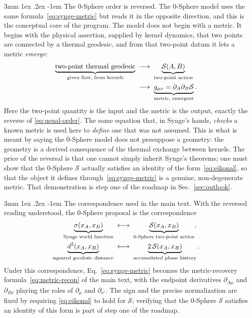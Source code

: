 \documentclass[%
 reprint, amsmath,amssymb, aps, prb, ]{revtex4-2}
\makeatletter
\numberwithin{equation}{section}
\renewcommand\paragraph{%
  \@startsection{paragraph}{4}{\z@}%
    {3mm \@plus 1ex \@minus .2ex}%
    {-1em}%
    {\normalfont\normalsize\itshape}}
\makeatother
\begin{document}
\paragraph{The 0-Sphere order is reversed.}
The 0-Sphere model uses the same formula~\eqref{eq:synge-metric} but reads it in the opposite direction, and this is the conceptual core of the program. The model does not begin with a metric. It begins with the physical assertion, supplied by kernel dynamics, that two points are connected by a thermal geodesic, and from that two-point datum it lets a metric \emph{emerge}:
\begin{align}
\underbrace{\text{two-point thermal geodesic}}_{\text{given first, from kernels}}
&\;\longrightarrow\;
\underbrace{\mathcal{S}(A,B)}_{\text{two-point action}}
\notag\\
&\;\longrightarrow\;
\underbrace{g_{\mu\nu}=\partial_A\partial_B\mathcal{S}}_{\text{metric, emergent}}.
\label{eq:zsm-order}
\end{align}
Here the two-point quantity is the input and the metric is the output, exactly the reverse of \eqref{eq:usual-order}. The same equation that, in Synge's hands, \emph{checks} a known metric is used here to \emph{define} one that was not assumed. This is what is meant by saying the 0-Sphere model does not presuppose a geometry: the geometry is a derived consequence of the thermal exchange between kernels. The price of the reversal is that one cannot simply inherit Synge's theorems; one must show that the 0-Sphere $\mathcal{S}$ actually satisfies an identity of the form~\eqref{eq:eikonal}, so that the object it defines through~\eqref{eq:synge-metric} is a genuine, non-degenerate metric. That demonstration is step one of the roadmap in Sec.~\ref{sec:outlook}.

\paragraph{The correspondence used in the main text.}
With the reversed reading understood, the 0-Sphere proposal is the correspondence
\begin{align}
\underbrace{\sigma(x_A,x_B)}_{\text{Synge world function}}
&\;\longleftrightarrow\;
\underbrace{\mathcal{S}(x_A,x_B)}_{\text{0-Sphere two-point action}},
\label{eq:corr}\\
\underbrace{d^2(x_A,x_B)}_{\text{squared geodesic distance}}
&\;\longleftrightarrow\;
\underbrace{2\,\mathcal{S}(x_A,x_B)}_{\text{accumulated phase history}}.
\notag
\end{align}
Under this correspondence, Eq.~\eqref{eq:synge-metric} becomes the metric-recovery formula~\eqref{eq:metric-recon} of the main text, with the endpoint derivatives $\partial_{A\mu}$ and $\partial_{B\nu}$ playing the roles of $\partial_\mu$ and $\partial_{\nu'}$. The sign and the precise normalization are fixed by requiring \eqref{eq:eikonal} to hold for $\mathcal{S}$; verifying that the 0-Sphere $\mathcal{S}$ satisfies an identity of this form is part of step one of the roadmap.
\end{document}

